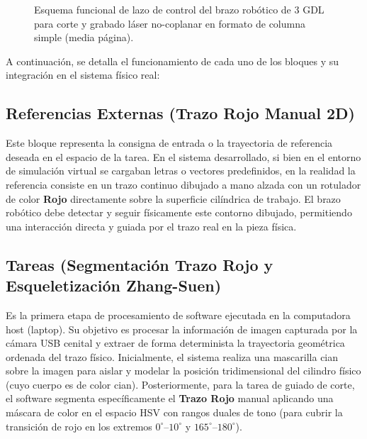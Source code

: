 \documentclass[conference,a4paper]{IEEEtran}
\begin{document}
\begin{figure}[!t]
{
}
\caption{Esquema funcional de lazo de control del brazo robótico de 3 GDL para corte y grabado láser no-coplanar en formato de columna simple (media página).}
\label{fig:functional_scheme}
\end{figure}

A continuación, se detalla el funcionamiento de cada uno de los bloques y su integración en el sistema físico real:

\subsection{Referencias Externas (Trazo Rojo Manual 2D)}
Este bloque representa la consigna de entrada o la trayectoria de referencia deseada en el espacio de la tarea. En el sistema desarrollado, si bien en el entorno de simulación virtual se cargaban letras o vectores predefinidos, en la realidad la referencia consiste en un trazo continuo dibujado a mano alzada con un rotulador de color \textbf{Rojo} directamente sobre la superficie cilíndrica de trabajo. El brazo robótico debe detectar y seguir físicamente este contorno dibujado, permitiendo una interacción directa y guiada por el trazo real en la pieza física.

\subsection{Tareas (Segmentación Trazo Rojo y Esqueletización Zhang-Suen)}
Es la primera etapa de procesamiento de software ejecutada en la computadora host (laptop). Su objetivo es procesar la información de imagen capturada por la cámara USB cenital y extraer de forma determinista la trayectoria geométrica ordenada del trazo físico. Inicialmente, el sistema realiza una mascarilla cian sobre la imagen para aislar y modelar la posición tridimensional del cilindro físico (cuyo cuerpo es de color cian). Posteriormente, para la tarea de guiado de corte, el software segmenta específicamente el \textbf{Trazo Rojo} manual aplicando una máscara de color en el espacio HSV con rangos duales de tono (para cubrir la transición de rojo en los extremos $0^\circ$--$10^\circ$ y $165^\circ$--$180^\circ$).
\end{document}
